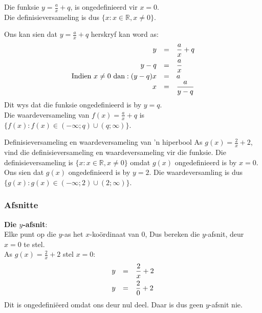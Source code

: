 Die funksie $y=\frac{a}{x}+q$, is ongedefinieerd vir $x=0$. \\
Die definisieversameling is dus $\{x:x\in \mathbb{R},x\ne 0\}$.\par 
Ons kan sien dat $y=\frac{a}{x}+q$ herskryf kan word as:
\begin{equation*}
\begin{array}{ccl}\hfill y& =& \dfrac{a}{x}+q\hfill \vspace{4pt} \\
 \hfill y-q& =& \dfrac{a}{x}\hfill \\
 \hfill \mbox{Indien }x \ne  0 ~\mbox{dan}:(y-q)x& =& a\hfill \\
 \hfill x& =& \dfrac{a}{y-q}\hfill 
\end{array}
\end{equation*}
Dit wys dat die funksie ongedefinieerd is by $y=q$. \\
Die waardeversameling van $f(x)=\frac{a}{x}+q$ is $\{f(x):f(x)\in (-\infty ;q)\cup (q;\infty )\}$.\par 

\begin{wex}{Definisieversameling en waardeversameling van 'n hiperbool}
{As $g(x)=\frac{2}{x}+2$, vind die definisieversameling en waardeversameling vir die funksie.}
{
Die definisieversameling is $\{x:x\in \mathbb{R},x\ne 0\}$ omdat $g(x)$ ongedefinieerd is by $x=0$.
Ons sien dat  $g(x)$ ongedefinieerd is by $y=2$.  Die waardeversamling is dus $\{g(x):g(x)\in (-\infty ;2)\cup (2;\infty )\}$.
}
\end{wex}


\subsubsection*{Afsnitte}

\textbf{Die $y$-afsnit}: \\
Elke punt op die $y$-as het $x$-ko\"ordinaat van $0$, Dus bereken die $y$-afsnit, deur $x=0$ te stel.\\
As $g(x)=\frac{2}{x}+2$ stel $x=0$:
\begin{equation*}
\begin{array}{ccc}\hfill y& =& \dfrac{2}{x}+2\hfill \vspace{4pt}\\
 \hfill y& =& \dfrac{2}{0}+2\hfill 
\end{array}
\end{equation*}
Dit is ongedefiniëerd omdat ons deur nul deel. Daar is dus geen $y$-afsnit nie.\\
\\

